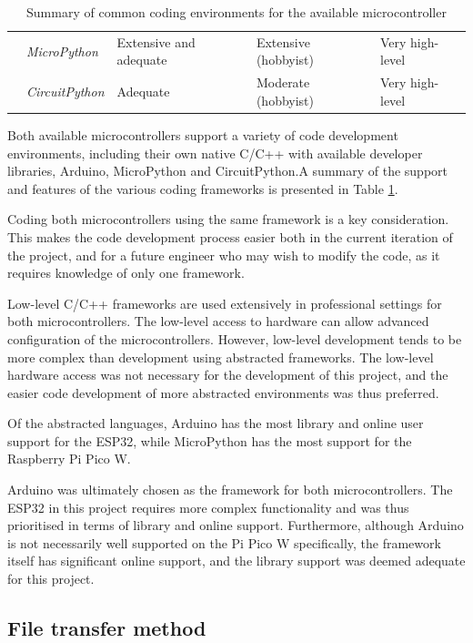\begin{table}[ht]
{\begin{tabular}{|l|l|l|l|l|}
                                         & \textit{MicroPython}        & Extensive and adequate   & Extensive (hobbyist)             & Very high-level            \\ \cline{2-5} 
                                         & \textit{CircuitPython}      & Adequate                 & Moderate (hobbyist)              & Very high-level            \\ \hline
    \end{tabular}%
    }
    \caption{Summary of common coding environments for the available microcontroller}
    \label{tab:coding-env}
    \end{table}

Both available microcontrollers support a variety of code development environments, including their own native C/C++ with available developer libraries, Arduino, MicroPython and CircuitPython.A summary of the support and features of the various coding frameworks is presented in Table \ref{tab:coding-env}.

Coding both microcontrollers using the same framework is a key consideration. This makes the code development process easier both in the current iteration of the project, and for a future engineer who may wish to modify the code, as it requires knowledge of only one framework. 

Low-level C/C++ frameworks are used extensively in professional settings for both microcontrollers. The low-level access to hardware can allow advanced configuration of the microcontrollers. However, low-level development tends to be more complex than development using abstracted frameworks. The low-level hardware access was not necessary for the development of this project, and the easier code development of more abstracted environments was thus preferred.

Of the abstracted languages, Arduino has the most library and online user support for the ESP32, while MicroPython has the most support for the Raspberry Pi Pico W.

Arduino was ultimately chosen as the framework for both microcontrollers. The ESP32 in this project requires more complex functionality and was thus prioritised in terms of library and online support. Furthermore, although Arduino is not necessarily well supported on the Pi Pico W specifically, the framework itself has significant online support, and the library support was deemed adequate for this project.

\subsection{File transfer method}

